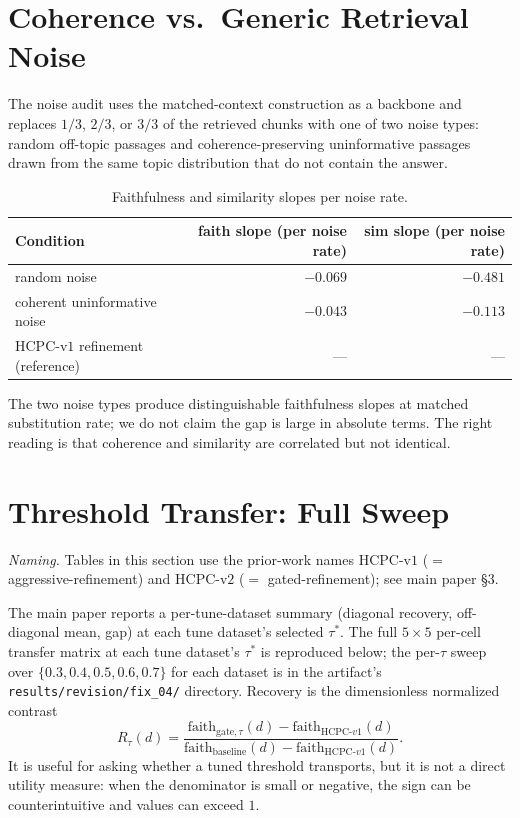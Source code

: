 \documentclass[11pt]{article}
\begin{document}
\section{Coherence vs.\ Generic Retrieval Noise}
\label{supp:noise}

The noise audit uses the matched-context construction as a backbone
and replaces $1/3$, $2/3$, or $3/3$ of the retrieved chunks with one
of two noise types: random off-topic passages and coherence-preserving
uninformative passages drawn from the same topic distribution that do
not contain the answer.

\begin{table}[!htb]
\centering
\caption{Faithfulness and similarity slopes per noise rate.}
\footnotesize
\begin{tabular}{lrr}
\toprule
Condition & faith slope (per noise rate) & sim slope (per noise rate) \\
\midrule
random noise                     & $-0.069$ & $-0.481$ \\
coherent uninformative noise     & $-0.043$ & $-0.113$ \\
HCPC-v$1$ refinement (reference) & ---      & ---      \\
\bottomrule
\end{tabular}
\end{table}

The two noise types produce distinguishable faithfulness slopes at
matched substitution rate; we do not claim the gap is large in absolute
terms. The right reading is that coherence and similarity are
correlated but not identical.

\section{Threshold Transfer: Full Sweep}
\label{supp:threshold}

\noindent\emph{Naming.} Tables in this section use the prior-work
names HCPC-v$1$ ($=$ aggressive-refinement) and HCPC-v$2$
($=$ gated-refinement); see main paper \S 3.

The main paper reports a per-tune-dataset summary
(diagonal recovery, off-diagonal mean, gap) at each tune dataset's
selected $\tau^\ast$. The full $5 \times 5$ per-cell transfer matrix at
each tune dataset's $\tau^\ast$ is reproduced below; the per-$\tau$
sweep over $\{0.3, 0.4, 0.5, 0.6, 0.7\}$ for each dataset is in the
artifact's \texttt{results/revision/fix\_04/} directory.
Recovery is the dimensionless normalized contrast
\[
R_\tau(d)=
\frac{\mathrm{faith}_{\mathrm{gate},\tau}(d) -
      \mathrm{faith}_{\mathrm{HCPC}\text{-}v1}(d)}
     {\mathrm{faith}_{\mathrm{baseline}}(d) -
      \mathrm{faith}_{\mathrm{HCPC}\text{-}v1}(d)}.
\]
It is useful for asking whether a tuned threshold transports, but it is
not a direct utility measure: when the denominator is small or negative,
the sign can be counterintuitive and values can exceed $1$.
\end{document}
